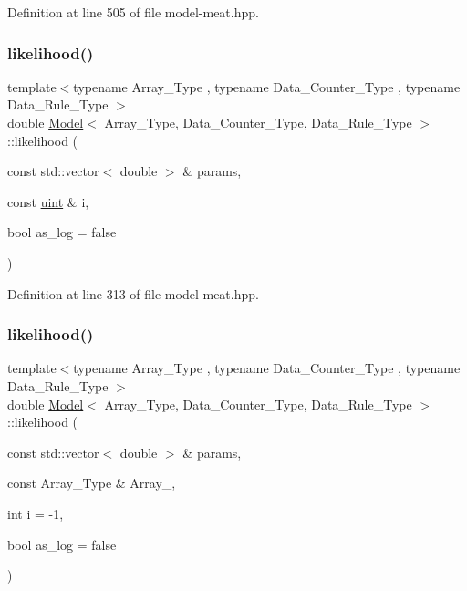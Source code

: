 Definition at line 505 of file model-\/meat.\+hpp.

\mbox{\label{class_model_ae75fe2213980b6b245e279c7836ab99b}} 
\subsubsection{\texorpdfstring{likelihood()}{likelihood()}\hspace{0.1cm}{\footnotesize\ttfamily [1/3]}}
{\footnotesize\ttfamily template$<$typename Array\+\_\+\+Type , typename Data\+\_\+\+Counter\+\_\+\+Type , typename Data\+\_\+\+Rule\+\_\+\+Type $>$ \\
double \hyperlink{class_model}{Model}$<$ Array\+\_\+\+Type, Data\+\_\+\+Counter\+\_\+\+Type, Data\+\_\+\+Rule\+\_\+\+Type $>$\+::likelihood (\begin{DoxyParamCaption}\item[{const std\+::vector$<$ double $>$ \&}]{params,  }\item[{const \hyperlink{typedefs_8hpp_a91ad9478d81a7aaf2593e8d9c3d06a14}{uint} \&}]{i,  }\item[{bool}]{as\+\_\+log = {\ttfamily false} }\end{DoxyParamCaption})\hspace{0.3cm}{\ttfamily [inline]}}



Definition at line 313 of file model-\/meat.\+hpp.

\mbox{\label{class_model_a147586ed14d850ebab2615c60aa29b80}} 
\subsubsection{\texorpdfstring{likelihood()}{likelihood()}\hspace{0.1cm}{\footnotesize\ttfamily [2/3]}}
{\footnotesize\ttfamily template$<$typename Array\+\_\+\+Type , typename Data\+\_\+\+Counter\+\_\+\+Type , typename Data\+\_\+\+Rule\+\_\+\+Type $>$ \\
double \hyperlink{class_model}{Model}$<$ Array\+\_\+\+Type, Data\+\_\+\+Counter\+\_\+\+Type, Data\+\_\+\+Rule\+\_\+\+Type $>$\+::likelihood (\begin{DoxyParamCaption}\item[{const std\+::vector$<$ double $>$ \&}]{params,  }\item[{const Array\+\_\+\+Type \&}]{Array\+\_\+,  }\item[{int}]{i = {\ttfamily -\/1},  }\item[{bool}]{as\+\_\+log = {\ttfamily false} }\end{DoxyParamCaption})\hspace{0.3cm}{\ttfamily [inline]}}



